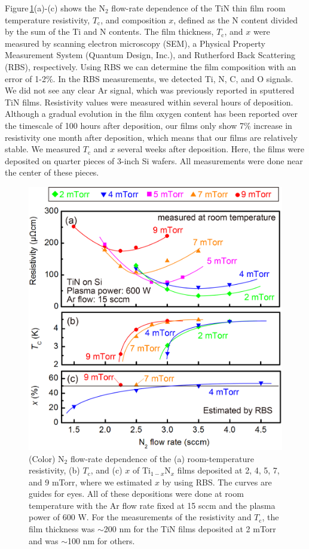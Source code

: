 Figure\,\ref{BasicProperties}(a)-(c) shows the N$_{2}$ flow-rate dependence of the TiN thin film room temperature resistivity, $T_{\text{c}}$, and composition $x$, defined as the N content divided by the sum of the Ti and N contents. The film thickness,  $T_{\text{c}}$, and $x$ were measured by scanning electron microscopy (SEM), a Physical Property Measurement System (Quantum Design, Inc.), and Rutherford Back Scattering (RBS), respectively. Using RBS we can determine the film composition with an error of 1-2\%. In the RBS measurements, we detected Ti, N, C, and O signals. We did not see any clear Ar signal, which was previously reported in sputtered TiN films.\cite{Williams1987}  Resistivity values were measured within several hours of deposition.  Although a gradual evolution in the film oxygen content has been reported over the timescale of 100 hours after deposition\cite{Logothetidis1999}, our films only show 7\% increase in resistivity one month after deposition, which means that our films are relatively stable.  We measured $T_{\text{c}}$ and $x$ several weeks after deposition. Here, the films were deposited on quarter pieces of 3-inch Si wafers.  All measurements were done near the center of these pieces.

\begin{figure}
\begin{center}
\includegraphics[width=125 mm]{BasicProperties.jpg}
\end{center}
\caption{(Color) N$_{2}$ flow-rate dependence of the (a) room-temperature resistivity, (b) $T_{\text{c}}$, and (c) $x$ of Ti$_{1-x}$N$_{x}$ films deposited at 2, 4, 5, 7, and 9 mTorr, where we estimated $x$ by using RBS. The curves are guides for eyes. All of these depositions were done at room temperature with the Ar flow rate fixed at 15 sccm and the plasma power of 600 W. For the measurements of the resistivity and $T_{\text{c}}$, the film thickness was $\sim$200 nm for the TiN films deposited at 2 mTorr and was $\sim$100 nm for others.}
\label{BasicProperties}
\end{figure}

